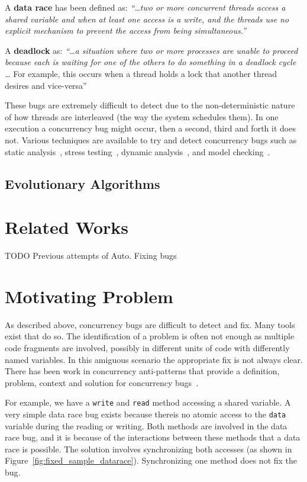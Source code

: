 \documentclass[10pt, conference, compsocconf]{IEEEtran}
\begin{document}
A \textbf{data race} has been defined as: \textit{``\ldots two or more
concurrent threads access a shared variable and when at least one access is a
write, and the threads use no explicit mechanism to prevent the access from
being simultaneous.''}~\cite{LSW07}

A \textbf{deadlock} as: \textit{``\ldots a situation where two
or more processes are unable to proceed because each is waiting for one of the
others to do something in a deadlock cycle \ldots} For example, this occurs
when a thread holds a lock that another thread desires and
vice-versa''~\cite{LSW07}

These bugs are extremely difficult to detect due to the non-deterministic
nature of how threads are interleaved (the way the system schedules them).
In one execution a concurrency bug might occur, then a second, third and forth
it does not. Various techniques are available to try and detect concurrency
bugs such as static analysis~\cite{NA07,NPSG09,HP04}, stress
testing~\cite{HSU03}, dynamic analysis~\cite{JNPS09,EFN+02}, and model
checking~\cite{BHPV00,RDH03,OM03,MQB07,Holz97,JM04,BHPV00,HP00}.

\subsection{Evolutionary Algorithms}

\section{Related Works}

TODO Previous attempts of Auto. Fixing bugs

\section{Motivating Problem}
\label{sec:motivation}

As described above, concurrency bugs are difficult to detect and fix. Many
tools exist that do so. The identification of a problem is often not enough
as multiple code fragments are involved, possibly in different units of code
with differently named variables. In this amiguous scenario the appropriate
fix is not always clear. There has been work in concurrency anti-patterns
that provide a definition, problem, context and solution for concurrency
bugs~\cite{BJ09}.

For example, we have a \texttt{write} and \texttt{read} method accessing a
shared variable. A very simple data race bug exists because thereis no atomic
access to the \texttt{data} variable during the reading or writing. Both
methods are involved in the data race bug, and it is because of the
interactions between these methods that a data race is possible. The solution
involves synchronizing both accesses (as shown in
Figure~\ref{fig:fixed_sample_datarace}). Synchronizing one method does not fix
the bug.
\end{document}
